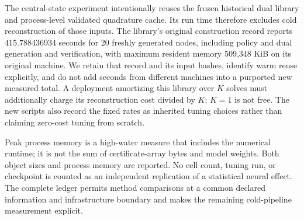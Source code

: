 The central-state experiment intentionally reuses the frozen historical dual library and process-level validated quadrature cache. Its run time therefore excludes cold reconstruction of those inputs. The library's original construction record reports $415.788436934$ seconds for 20 freshly generated nodes, including policy and dual generation and verification, with maximum resident memory 509,348 KiB on its original machine. We retain that record and its input hashes, identify warm reuse explicitly, and do not add seconds from different machines into a purported new measured total. A deployment amortizing this library over $K$ solves must additionally charge its reconstruction cost divided by $K$; $K=1$ is not free. The new scripts also record the fixed rates as inherited tuning choices rather than claiming zero-cost tuning from scratch.

Peak process memory is a high-water measure that includes the numerical runtime; it is not the sum of certificate-array bytes and model weights. Both object sizes and process memory are reported. No cell count, tuning run, or checkpoint is counted as an independent replication of a statistical neural effect. The complete ledger permits method comparisons at a common declared information and infrastructure boundary and makes the remaining cold-pipeline measurement explicit.
